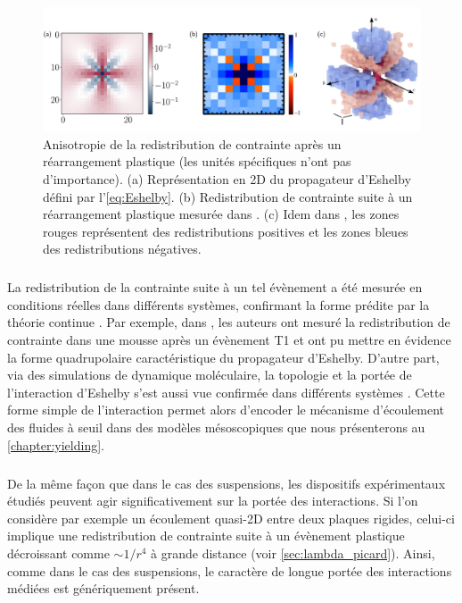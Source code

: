 \begin{figure}[h]
	\centering
	\includegraphics[width=\textwidth]{Chapitre1/Figures/InterpretationCDP/EshelbyExp.pdf}
	\caption{Anisotropie de la redistribution de contrainte après un réarrangement plastique (les unités spécifiques n'ont pas d'importance). (a) Représentation en 2D du propagateur d'Eshelby défini par l'\autoref{eq:Eshelby}. (b) Redistribution de contrainte suite à un réarrangement plastique mesurée dans \cite{desmond_measurement_2015}. (c) Idem dans \cite{schott_multiscale_2024}, les zones rouges représentent des redistributions positives et les zones bleues des redistributions négatives.}
	\label{fig:EshelbyExp}
\end{figure}

\subparagraph{}La redistribution de la contrainte suite à un tel évènement a été mesurée en conditions réelles dans différents systèmes, confirmant la forme prédite par la théorie continue \cite{desmond_measurement_2015, schott_multiscale_2024, jensen_local_2014}. Par exemple, dans \cite{schott_multiscale_2024}, les auteurs ont mesuré la redistribution de contrainte dans une mousse après un évènement T1 et ont pu mettre en évidence la forme quadrupolaire caractéristique du propagateur d'Eshelby. D'autre part, via des simulations de dynamique moléculaire, la topologie et la portée de l'interaction d'Eshelby s'est aussi vue confirmée dans différents systèmes \cite{kabla_local_2003, maloney_amorphous_2006, tanguy_plastic_2006}. Cette forme simple de l'interaction permet alors d'encoder le mécanisme d'écoulement des fluides à seuil dans des modèles mésoscopiques que nous présenterons au \autoref{chapter:yielding}.

\subparagraph{}De la même façon que dans le cas des suspensions, les dispositifs expérimentaux étudiés peuvent agir significativement sur la portée des interactions. Si l'on considère par exemple un écoulement quasi-2D entre deux plaques rigides, celui-ci implique une redistribution de contrainte suite à un évènement plastique décroissant comme $\sim 1/r^4$ à grande distance (voir \autoref{sec:lambda_picard}). Ainsi, comme dans le cas des suspensions, le caractère de longue portée des interactions médiées est génériquement présent.


